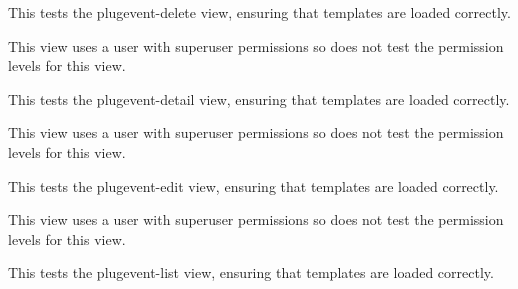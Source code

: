 \documentclass[letterpaper,10pt,english]{sphinxmanual}
\begin{document}
\begin{fulllineitems}

\begin{fulllineitems}
\label{api:mousedb.timed_mating.tests.Timed_MatingViewTests.test_plugevent_delete}
This tests the plugevent-delete view, ensuring that templates are loaded correctly.

This view uses a user with superuser permissions so does not test the permission levels for this view.

\end{fulllineitems}


\begin{fulllineitems}
\label{api:mousedb.timed_mating.tests.Timed_MatingViewTests.test_plugevent_detail}
This tests the plugevent-detail view, ensuring that templates are loaded correctly.

This view uses a user with superuser permissions so does not test the permission levels for this view.

\end{fulllineitems}


\begin{fulllineitems}
\label{api:mousedb.timed_mating.tests.Timed_MatingViewTests.test_plugevent_edit}
This tests the plugevent-edit view, ensuring that templates are loaded correctly.

This view uses a user with superuser permissions so does not test the permission levels for this view.

\end{fulllineitems}


\begin{fulllineitems}
\label{api:mousedb.timed_mating.tests.Timed_MatingViewTests.test_plugevent_list}
This tests the plugevent-list view, ensuring that templates are loaded correctly.


\end{fulllineitems}
\end{fulllineitems}
\end{document}
